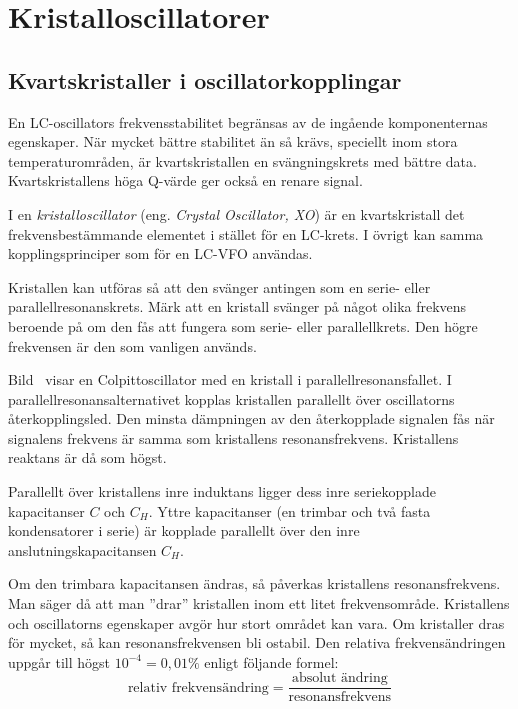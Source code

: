 \newpage
\section{Kristalloscillatorer}
\label{kristalloscillator}

\subsection{Kvartskristaller i oscillator\-kopplingar}

En LC-oscillators frekvensstabilitet begränsas av de ingående
komponenternas egenskaper.
När mycket bättre stabilitet än så krävs, speciellt inom stora
temperaturområden, är kvartskristallen en svängningskrets med bättre data.
Kvartskristallens höga Q-värde ger också en renare signal.


I en \emph{kristalloscillator} (eng. \emph{Crystal Oscillator, XO}) är en
kvartskristall det frekvensbestämmande elementet i stället för en LC-krets.
I övrigt kan samma kopplingsprinciper som för en LC-VFO användas.

Kristallen kan utföras så att den svänger antingen som en serie- eller
parallellresonanskrets.
Märk att en kristall svänger på något olika frekvens beroende på om den fås
att fungera som serie- eller parallellkrets.
Den högre frekvensen är den som vanligen används.

Bild~ visar en Colpittoscillator med en kristall i
parallellresonansfallet.
I parallellresonansalternativet kopplas kristallen parallellt över
oscillatorns återkopplingsled.
Den minsta dämpningen av den återkopplade signalen fås när signalens frekvens
är samma som kristallens resonansfrekvens.
Kristallens reaktans är då som högst.

Parallellt över kristallens inre induktans ligger dess inre
seriekopplade kapacitanser \(C\) och \(C_H\).
Yttre kapacitanser (en trimbar och två fasta kondensatorer i serie) är kopplade
parallellt över den inre anslutningskapacitansen \(C_H\).

Om den trimbara kapacitansen ändras, så påverkas kristallens resonansfrekvens.
Man säger då att man ''drar'' kristallen inom ett litet frekvensområde.
Kristallens och oscillatorns egenskaper avgör hur stort området kan vara.
Om kristaller dras för mycket, så kan resonansfrekvensen bli ostabil.
Den relativa frekvensändringen uppgår till högst \(10^{-4} = 0,01\%\)
enligt följande formel:
%
\[
\text{relativ frekvensändring} =
\frac{\text{absolut ändring}}{\text{resonansfrekvens}}
\]

